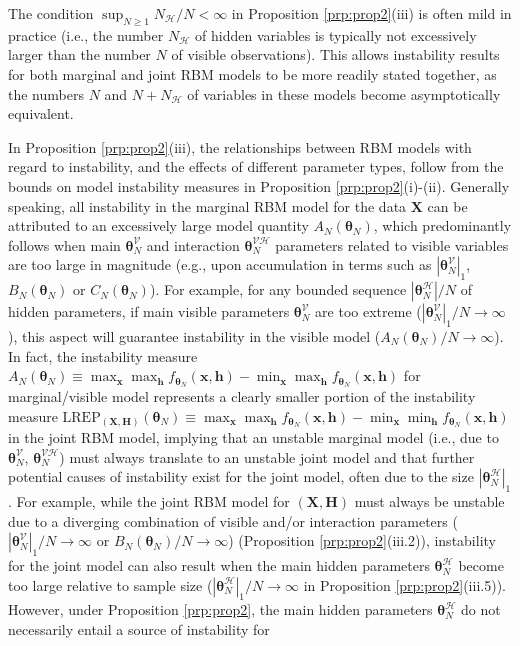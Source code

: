 \documentclass[numbib]{imamat}
\theoremstyle{theorem}
\theoremstyle{lemma}
\theoremstyle{example}
\theoremstyle{corollary}
\theoremstyle{definition}
\theoremstyle{remark}
\theoremstyle{approximation}
\theoremstyle{scheme}
\newcommand{\REP}{\mathrm{LREP}}
\newcommand{\elt}{A_{N}(\boldsymbol \theta_N) }
\newcommand{\Gam}{B_{N}(\boldsymbol \theta_N) }
\newcommand{\Gamc}{C_{N}(\boldsymbol \theta_N) }
\let\BeginKnitrBlock\begin \let\EndKnitrBlock\end
\begin{document}
\BeginKnitrBlock{remark}
\iffalse{} {Remark. } \fi{}The condition \(\sup_{N \geq 1} N_{\mathcal{H}}/N<\infty\) in Proposition \ref{prp:prop2}(iii) is often mild in practice (i.e., the number \(N_{\mathcal{H}}\) of hidden variables is typically not excessively larger than the number \(N\) of visible observations). This allows instability results for both marginal and joint RBM models to be more readily stated together, as the numbers \(N\) and \(N+N_{\mathcal{H}}\) of variables in these models become asymptotically equivalent.
\EndKnitrBlock{remark}

In Proposition \ref{prp:prop2}(iii), the relationships between RBM models with regard to instability, and the effects of different parameter types, follow from the bounds on model instability measures in Proposition \ref{prp:prop2}(i)-(ii). Generally speaking, all instability in the marginal RBM model for the data \(\boldsymbol X\) can be attributed to an excessively large model quantity \(\elt\), which predominantly follows when main \(\boldsymbol \theta_N^{\mathcal{V}}\) and interaction \(\boldsymbol \theta_N^{\mathcal{VH}}\) parameters related to visible variables are too large in magnitude (e.g., upon accumulation in terms such as \(|\boldsymbol \theta_N^{\mathcal{V}}|_1\), \(\Gam\) or \(\Gamc\)). For example, for any bounded sequence \(|\boldsymbol \theta_N^{\mathcal{H}}|/N\) of hidden parameters, if main visible parameters \(\boldsymbol \theta_N^{\mathcal{V}}\) are too extreme (\(|\boldsymbol \theta_N^{\mathcal{V}}|_1/N\to \infty\)), this aspect will guarantee instability in the visible model (\(\elt/N\to \infty\)). In fact, the instability measure \(\elt \equiv \max_{ \boldsymbol x} \max_{ \boldsymbol h } f_{\boldsymbol \theta_N} (\boldsymbol x, \boldsymbol h)-\min_{ \boldsymbol x } \max_{ \boldsymbol h }f_{\boldsymbol \theta_N} (\boldsymbol x, \boldsymbol h)\) for marginal/visible model represents a clearly smaller portion of the instability measure \(\REP_{(\boldsymbol X, \boldsymbol H)}(\boldsymbol \theta_N)\equiv \max_{ \boldsymbol x} \max_{ \boldsymbol h } f_{\boldsymbol \theta_N} (\boldsymbol x, \boldsymbol h)-\min_{ \boldsymbol x } \min_{ \boldsymbol h } f_{\boldsymbol \theta_N} (\boldsymbol x, \boldsymbol h)\) in the joint RBM model, implying that an unstable marginal model (i.e., due to \(\boldsymbol \theta_N^{\mathcal{V}}\), \(\boldsymbol \theta_N^{\mathcal{VH}}\)) must always translate to an unstable joint model and that further potential causes of instability exist for the joint model, often due to the size \(|\boldsymbol \theta_N^{\mathcal{H}}|_1\). For example, while the joint RBM model for \((\boldsymbol X,\boldsymbol H)\) must always be unstable due to a diverging combination of visible and/or interaction parameters (\(|\boldsymbol \theta_N^{\mathcal{V}}|_1/N\to \infty\) or \(\Gam/N\to \infty\)) (Proposition \ref{prp:prop2}(iii.2)), instability for the joint model can also result when the main hidden parameters \(\boldsymbol \theta_N^{\mathcal{H}}\) become too large relative to sample size (\(|\boldsymbol \theta_N^{\mathcal{H}}|_1/N\to \infty\) in Proposition \ref{prp:prop2}(iii.5)). However, under Proposition \ref{prp:prop2}, the main hidden parameters \(\boldsymbol \theta_N^{\mathcal{H}}\) do not necessarily entail a source of instability for 
\end{document}
